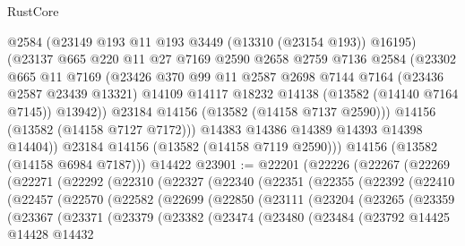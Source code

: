 \begin{lexlean}{RustCore}
\begin{coremodule}
              @2584
              (@23149 @193 @11 @193 @3449 (@13310 (@23154 @193)) @16195)
              (@23137
                @665
                @220
                @11
                @27
                @7169
                @2590
                @2658
                @2759
                @7136
                @2584
                (@23302
                  @665
                  @11
                  @7169
                  (@23426
                    @370
                    @99
                    @11
                    @2587
                    @2698
                    @7144
                    @7164
                    (@23436 @2587 @23439 @13321)
                    @14109
                    @14117
                    @18232
                    @14138
                    (@13582 (@14140 @7164 @7145))
                    @13942))
                @23184
                @14156
                (@13582 (@14158 @7137 @2590)))
              @14156
              (@13582 (@14158 @7127 @7172)))
            @14383
            @14386
            @14389
            @14393
            @14398
            @14404))
        @23184
        @14156
        (@13582 (@14158 @7119 @2590)))
      @14156
      (@13582 (@14158 @6984 @7187)))
    @14422
@23901 := @22201
    (@22226
      (@22267
        (@22269
          (@22271
            (@22292
              (@22310
                (@22327
                  (@22340
                    (@22351
                      (@22355
                        (@22392
                          (@22410
                            (@22457
                              (@22570
                                (@22582
                                  (@22699
                                    (@22850
                                      (@23111
                                        (@23204
                                          (@23265
                                            (@23359
                                              (@23367
                                                (@23371
                                                  (@23379
                                                    (@23382
                                                      (@23474
                                                        (@23480
                                                          (@23484
                                                            (@23792
                                                              @14425
                                                              @14428
                                                              @14432

\end{coremodule}
\end{lexlean}
